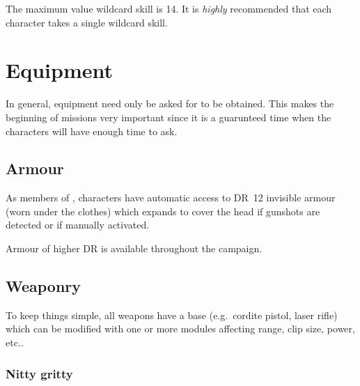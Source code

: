   The maximum value wildcard skill is 14. It is \emph{highly} recommended that
  each character takes a single wildcard skill.
  

\section{Equipment}

In general, equipment need only be asked for to be obtained. This makes the
beginning of missions very important since it is a guarunteed time when the
characters will have enough time to ask.

\subsection{Armour}
\label{sec:armour}

As members of \thecompany, characters have automatic access to DR~12 invisible
armour (worn under the clothes) which expands to cover the head if gunshots are
detected or if manually activated.

Armour of higher DR is available throughout the campaign.

\subsection{Weaponry}
To keep things simple, all weapons have a base (e.g.~cordite pistol, laser
rifle) which can be modified with one or more modules affecting range, clip
size, power, etc..



\subsubsection{Nitty gritty}
\label{sec:nitty-gritty}

